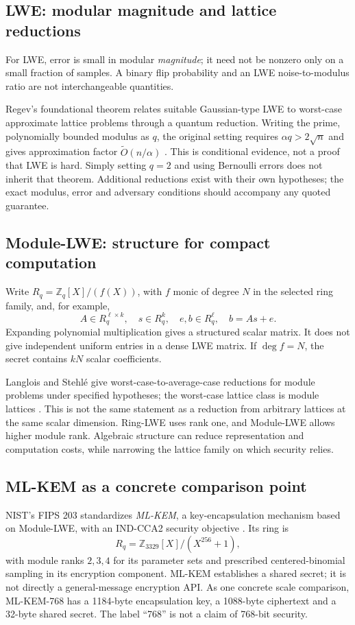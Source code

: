 \documentclass[11pt,a4paper]{article}
\newcommand{\Z}{\mathbb Z}
\begin{document}
\subsection{LWE: modular magnitude and lattice reductions}
For LWE, error is small in modular \emph{magnitude}; it need not be nonzero only on a small fraction of samples. A binary flip probability and an LWE noise-to-modulus ratio are not interchangeable quantities.

Regev's foundational theorem relates suitable Gaussian-type LWE to worst-case approximate lattice problems through a quantum reduction. Writing the prime, polynomially bounded modulus as $q$, the original setting requires $\alpha q>2\sqrt n$ and gives approximation factor $\widetilde O(n/\alpha)$ \cite{regev}. This is conditional evidence, not a proof that LWE is hard. Simply setting $q=2$ and using Bernoulli errors does not inherit that theorem. Additional reductions exist with their own hypotheses; the exact modulus, error and adversary conditions should accompany any quoted guarantee.

\subsection{Module-LWE: structure for compact computation}
Write $R_q=\Z_q[X]/(f(X))$, with $f$ monic of degree $N$ in the selected ring family, and, for example,
\[
 A\in R_q^{\ell\times k},\quad s\in R_q^k,\quad e,b\in R_q^\ell,\quad b=As+e.
\]
Expanding polynomial multiplication gives a structured scalar matrix. It does not give independent uniform entries in a dense LWE matrix. If $\deg f=N$, the secret contains $kN$ scalar coefficients.

Langlois and Stehl\'e give worst-case-to-average-case reductions for module problems under specified hypotheses; the worst-case lattice class is module lattices \cite{ls}. This is not the same statement as a reduction from arbitrary lattices at the same scalar dimension. Ring-LWE uses rank one, and Module-LWE allows higher module rank. Algebraic structure can reduce representation and computation costs, while narrowing the lattice family on which security relies.

\subsection{ML-KEM as a concrete comparison point}
NIST's FIPS 203 standardizes \emph{ML-KEM}, a key-encapsulation mechanism based on Module-LWE, with an IND-CCA2 security objective \cite{fips203}. Its ring is
\[
 R_q=\Z_{3329}[X]/(X^{256}+1),
\]
with module ranks $2,3,4$ for its parameter sets and prescribed centered-binomial sampling in its encryption component. ML-KEM establishes a shared secret; it is not directly a general-message encryption API. As one concrete scale comparison, ML-KEM-768 has a 1184-byte encapsulation key, a 1088-byte ciphertext and a 32-byte shared secret. The label ``768'' is not a claim of 768-bit security.
\end{document}
